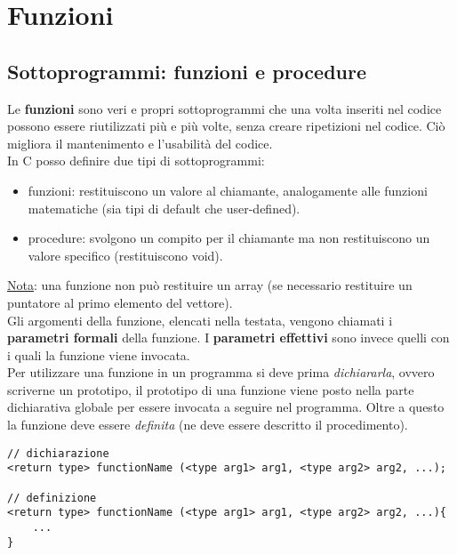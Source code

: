 \section{Funzioni}\label{funzioni}
\subsection{Sottoprogrammi: funzioni e procedure}
Le \textbf{funzioni} sono veri e propri sottoprogrammi che una volta inseriti nel codice possono essere riutilizzati più e più volte, senza creare ripetizioni nel codice. Ciò migliora il mantenimento e l'usabilità del codice.\\
In C posso definire due tipi di sottoprogrammi: 
\begin{itemize}
	\item funzioni: restituiscono un valore al chiamante, analogamente alle funzioni matematiche (sia tipi di default che user-defined).
	\item procedure: svolgono un compito per il chiamante ma non restituiscono un valore specifico (restituiscono \colorbox{light-gray}{void}).
\end{itemize}
\underline{Nota}: una funzione non può restituire un array (se necessario restituire un puntatore al primo elemento del vettore).\\
Gli argomenti della funzione, elencati nella testata, vengono chiamati i \textbf{parametri formali} della funzione. I \textbf{parametri effettivi} sono invece quelli con i quali la funzione viene invocata.\\
Per utilizzare una funzione in un programma si deve prima \textit{dichiararla}, ovvero scriverne un prototipo, il prototipo di una funzione viene posto nella parte dichiarativa globale per essere invocata a seguire nel programma. Oltre a questo la funzione deve essere \textit{definita} (ne deve essere descritto il procedimento).  
\begin{lstlisting}[title={Dichiarazione di una funzione}]
// dichiarazione
<return type> functionName (<type arg1> arg1, <type arg2> arg2, ...);

// definizione
<return type> functionName (<type arg1> arg1, <type arg2> arg2, ...){
    ...
}
\end{lstlisting}

